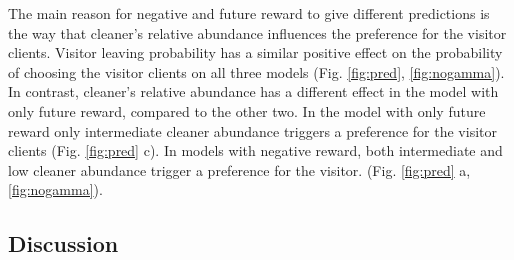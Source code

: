 \documentclass[]{rsos}%
\begin{document}
The main reason for negative and future reward to give different
predictions is the way that cleaner's relative abundance influences the
preference for the visitor clients. Visitor leaving probability has a
similar positive effect on the probability of choosing the visitor
clients on all three models (Fig. \ref{fig:pred}, \ref{fig:nogamma}). In
contrast, cleaner's relative abundance has a different effect in the
model with only future reward, compared to the other two. In the model
with only future reward only intermediate cleaner abundance triggers a
preference for the visitor clients (Fig. \ref{fig:pred} c). In models
with negative reward, both intermediate and low cleaner abundance
trigger a preference for the visitor. (Fig. \ref{fig:pred} a,
\ref{fig:nogamma}).

\hypertarget{discussion}{%
\subsection{Discussion}\label{discussion}}
\end{document}
